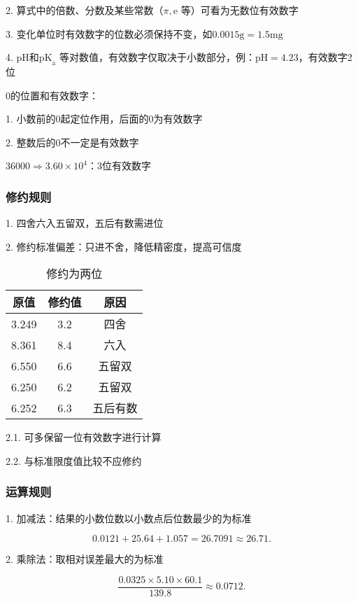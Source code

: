 2. 算式中的倍数、分数及某些常数（$\pi,\text{e}$ 等）可看为无数位有效数字

3. 变化单位时有效数字的位数必须保持不变，如$0.0015\text{g}=1.5\text{mg}$ 

4. pH和$\text{pK}_{\text{a}}$ 等对数值，有效数字仅取决于小数部分，例：$\text{pH}=4.23$，有效数字2位

\begin{notation}
    0的位置和有效数字：

    1. 小数前的0起定位作用，后面的0为有效数字

    2. 整数后的0不一定是有效数字

    \begin{eg}
        $36000 \Rightarrow 3.60\times 10^4$：3位有效数字
    \end{eg}    
\end{notation}
\subsubsection{修约规则}%
\label{subsub:修约规则}
1. 四舍六入五留双，五后有数需进位

2. 修约标准偏差：只进不舍，降低精密度，提高可信度

\begin{table}[htpb]
    \centering
    \caption{修约为两位}
    \label{tab:修约为两位}
    \begin{tabular}{ccc}
    \toprule
    原值 & 修约值 & 原因\\
    \midrule
    3.249 & 3.2 & 四舍\\
    8.361 & 8.4 & 六入\\
    6.550 & 6.6 & 五留双\\
    6.250 & 6.2 & 五留双\\
    6.252 & 6.3 & 五后有数\\
    \bottomrule
    \end{tabular}
\end{table}

2.1. 可多保留一位有效数字进行计算

2.2. 与标准限度值比较不应修约
\subsubsection{运算规则}%
\label{subsub:运算规则}
1. 加减法：结果的小数位数以小数点后位数最少的为标准
\begin{eg}
\[
    0.0121+25.64+1.057=26.7091\approx 26.71
.\]
\end{eg}

2. 乘除法：取相对误差最大的为标准
\begin{eg}
    \[
        \frac{0.0325\times 5.10\times 60.1}{139.8}\approx 0.0712
    .\]     
\end{eg}

